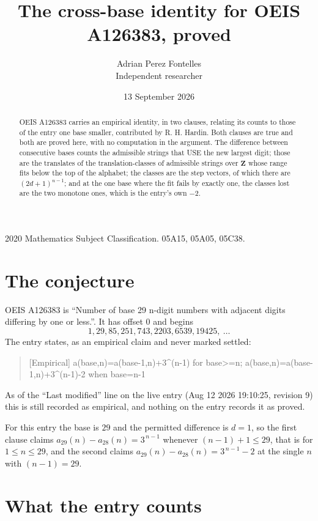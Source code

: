 \documentclass[11pt,a4paper]{article}
\title{The cross-base identity for OEIS A126383, proved}
\author{Adrian Perez Fontelles\\ \small Independent researcher}
\date{13 September 2026}
\theoremstyle{plain}
\theoremstyle{definition}
\begin{document}
\maketitle

\begin{abstract}
OEIS A126383 carries an empirical identity, in two clauses, relating its counts to those of the
entry one base smaller, contributed by R. H. Hardin. Both clauses are true and both are proved
here, with no computation in the argument. The difference between consecutive bases counts the
admissible strings that USE the new largest digit; those are the translates of the
translation-classes of admissible strings over $\mathbf{Z}$ whose range fits below the top of
the alphabet; the classes are the step vectors, of which there are $(2d+1)^{n-1}$; and at the
one base where the fit fails by exactly one, the classes lost are the two monotone ones, which
is the entry's own $-2$.
\end{abstract}

\noindent\small 2020 Mathematics Subject Classification. 05A15, 05A05, 05C38.\normalsize

\section{The conjecture}

OEIS A126383 is ``Number of base 29 n-digit numbers with adjacent digits differing by one or less.''. It has offset $0$ and begins
\[
1, 29, 85, 251, 743, 2203, 6539, 19425,\ \dots
\]
The entry states, as an empirical claim and never marked settled:
\begin{quote}
[Empirical] a(base,n)=a(base-1,n)+3\textasciicircum{}(n-1) for base>=n; a(base,n)=a(base-1,n)+3\textasciicircum{}(n-1)-2 when base=n-1
\end{quote}
As of the ``Last modified'' line on the live entry (Aug 12 2026 19:10:25, revision 9)
this is still recorded as empirical, and nothing on the entry records it as proved.

For this entry the base is $29$ and the permitted difference is $d=1$, so the first clause
claims $a_{29}(n)-a_{28}(n)=3^{\,n-1}$ whenever $(n-1)+1\le29$, that is for
$1\le n\le29$, and the second claims $a_{29}(n)-a_{28}(n)=3^{\,n-1}-2$ at the single
$n$ with $(n-1)=29$.

\section{What the entry counts}
\end{document}
